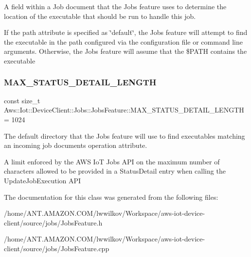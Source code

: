 A field within a Job document that the Jobs feature uses to determine the location of the executable that should be run to handle this job. 

If the path attribute is specified as \char`\"{}default\char`\"{}, the Jobs feature will attempt to find the executable in the path configured via the configuration file or command line arguments. Otherwise, the Jobs feature will assume that the \$\+P\+A\+TH contains the executable \mbox{\label{class_aws_1_1_iot_1_1_device_client_1_1_jobs_1_1_jobs_feature_a3f0629514f8a97930ded3e64aae5f952}} 
\subsubsection{\texorpdfstring{M\+A\+X\+\_\+\+S\+T\+A\+T\+U\+S\+\_\+\+D\+E\+T\+A\+I\+L\+\_\+\+L\+E\+N\+G\+TH}{MAX\_STATUS\_DETAIL\_LENGTH}}
{\footnotesize\ttfamily const size\+\_\+t Aws\+::\+Iot\+::\+Device\+Client\+::\+Jobs\+::\+Jobs\+Feature\+::\+M\+A\+X\+\_\+\+S\+T\+A\+T\+U\+S\+\_\+\+D\+E\+T\+A\+I\+L\+\_\+\+L\+E\+N\+G\+TH = 1024\hspace{0.3cm}{\ttfamily [private]}}



The default directory that the Jobs feature will use to find executables matching an incoming job document\textquotesingle{}s operation attribute. 

A limit enforced by the A\+WS IoT Jobs A\+PI on the maximum number of characters allowed to be provided in a Status\+Detail entry when calling the Update\+Job\+Execution A\+PI 

The documentation for this class was generated from the following files\+:\begin{DoxyCompactItemize}
\item 
/home/\+A\+N\+T.\+A\+M\+A\+Z\+O\+N.\+C\+O\+M/lwwilkov/\+Workspace/aws-\/iot-\/device-\/client/source/jobs/Jobs\+Feature.\+h\item 
/home/\+A\+N\+T.\+A\+M\+A\+Z\+O\+N.\+C\+O\+M/lwwilkov/\+Workspace/aws-\/iot-\/device-\/client/source/jobs/Jobs\+Feature.\+cpp\end{DoxyCompactItemize}
